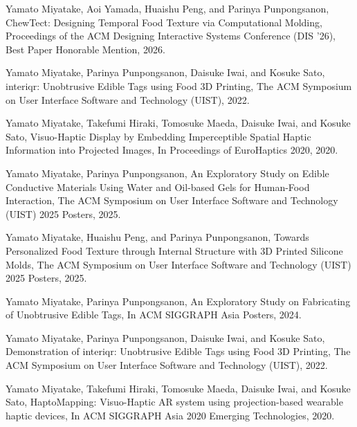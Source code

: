 \documentclass[10pt,a4paper]{article}
\newcommand{\pubheading}[1]{\vspace{3pt}{\bfseries\sffamily\small #1}\vspace{-3pt}}
\begin{document}
\pubheading{CONFERENCE PAPERS (full papers)}
\begin{publist}[resume]
\item Yamato Miyatake, Aoi Yamada, Huaishu Peng, and Parinya Punpongsanon, ChewTect: Designing Temporal Food Texture via Computational Molding, Proceedings of the ACM Designing Interactive Systems Conference (DIS '26), Best Paper Honorable Mention, 2026.
\item Yamato Miyatake, Parinya Punpongsanon, Daisuke Iwai, and Kosuke Sato, interiqr: Unobtrusive Edible Tags using Food 3D Printing, The ACM Symposium on User Interface Software and Technology (UIST), 2022.
\item Yamato Miyatake, Takefumi Hiraki, Tomosuke Maeda, Daisuke Iwai, and Kosuke Sato, Visuo-Haptic Display by Embedding Imperceptible Spatial Haptic Information into Projected Images, In Proceedings of EuroHaptics 2020, 2020.
\end{publist}

\pubheading{CONFERENCE PAPERS (short papers, demos, and posters)}
\begin{publist}[resume]
\item Yamato Miyatake, Parinya Punpongsanon, An Exploratory Study on Edible Conductive Materials Using Water and Oil-based Gels for Human-Food Interaction, The ACM Symposium on User Interface Software and Technology (UIST) 2025 Posters, 2025.
\item Yamato Miyatake, Huaishu Peng, and Parinya Punpongsanon, Towards Personalized Food Texture through Internal Structure with 3D Printed Silicone Molds, The ACM Symposium on User Interface Software and Technology (UIST) 2025 Posters, 2025.
\item Yamato Miyatake, Parinya Punpongsanon, An Exploratory Study on Fabricating of Unobtrusive Edible Tags, In ACM SIGGRAPH Asia Posters, 2024.
\item Yamato Miyatake, Parinya Punpongsanon, Daisuke Iwai, and Kosuke Sato, Demonstration of interiqr: Unobtrusive Edible Tags using Food 3D Printing, The ACM Symposium on User Interface Software and Technology (UIST), 2022.
\item Yamato Miyatake, Takefumi Hiraki, Tomosuke Maeda, Daisuke Iwai, and Kosuke Sato, HaptoMapping: Visuo-Haptic AR system using projection-based wearable haptic devices, In ACM SIGGRAPH Asia 2020 Emerging Technologies, 2020.
\end{publist}
\end{document}
